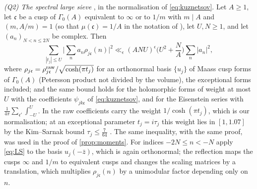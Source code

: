 \documentclass[11pt,colorlinks]{charlie}
\begin{document}
\emph{(Q2) The spectral large sieve} \cite[Theorem~2]{DI}, in the normalisation of \eqref{eq:kuznetsov}. Let $A\ge1$, let $\mathfrak c$ be a cusp of $\Gamma_0(A)$ equivalent to $\infty$ or to $1/m$ with $m\mid A$ and $(m,A/m)=1$ (so that $\mu(\mathfrak c)=1/A$ in the notation of \cite{DI}), let $U,N\ge1$, and let $(a_n)_{N<n\le2N}$ be complex. Then
\begin{equation}\label{eq:LS}
 \sum_{|t_j|\le U}\Big|\sum_na_n\rho_{j\mathfrak c}(n)\Big|^2\ll_\epsilon(ANU)^\epsilon\Big(U^2+\frac NA\Big)\sum_n|a_n|^2,
\end{equation}
where $\rho_{j\mathfrak c}=\rho^{\rm raw}_{j\mathfrak c}/\sqrt{\cosh(\pi t_j)}$ for an orthonormal basis $\{u_j\}$ of Maass cusp forms of $\Gamma_0(A)$ (Petersson product not divided by the volume), the exceptional forms included; and the same bound holds for the holomorphic forms of weight at most $U$ with the coefficients $\psi_{jk\mathfrak c}$ of \eqref{eq:kuznetsov}, and for the Eisenstein series with $\frac1{4\pi}\sum_{\mathfrak c'}\int_{-U}^U$. In \cite[Theorem~2]{DI} the raw coefficients carry the weight $1/\cosh(\pi t_j)$, which is our normalisation; at an exceptional parameter $t_j=i\tau_j$ this weight lies in $[1,1.07]$ by the Kim--Sarnak bound $\tau_j\le\frac7{64}$ \cite{KimSarnak}. The same inequality, with the same proof, was used in the proof of \cref{prop:moments}. For indices $-2N\le n<-N$ apply \eqref{eq:LS} to the basis $u_j(-\bar z)$, which is again orthonormal; the reflection maps the cusps $\infty$ and $1/m$ to equivalent cusps and changes the scaling matrices by a translation, which multiplies $\rho_{j\mathfrak c}(n)$ by a unimodular factor depending only on $n$.
\end{document}
